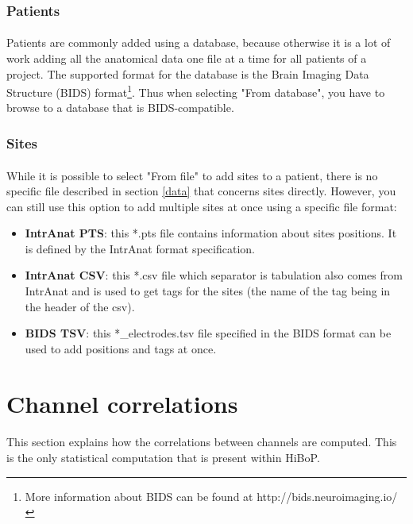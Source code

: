 \documentclass[a4paper]{article}
\begin{document}
\subsubsection{Patients}
\paragraph{} Patients are commonly added using a database, because otherwise it is a lot of work adding all the anatomical data one file at a time for all patients of a project. The supported format for the database is the Brain Imaging Data Structure (BIDS) format\footnote{More information about BIDS can be found at http://bids.neuroimaging.io/}. Thus when selecting "From database", you have to browse to a database that is BIDS-compatible.
\subsubsection{Sites}
\paragraph{} While it is possible to select "From file" to add sites to a patient, there is no specific file described in section \ref{data} that concerns sites directly. However, you can still use this option to add multiple sites at once using a specific file format:
\begin{itemize}
\item \textbf{IntrAnat PTS}: this *.pts file contains information about sites positions. It is defined by the IntrAnat format specification.
\item \textbf{IntrAnat CSV}: this *.csv file which separator is tabulation also comes from IntrAnat and is used to get tags for the sites (the name of the tag being in the header of the csv).
\item \textbf{BIDS TSV}: this *\_electrodes.tsv file specified in the BIDS format can be used to add positions and tags at once.
\end{itemize}
\section{Channel correlations}\label{correlations}
\paragraph{} This section explains how the correlations between channels are computed. This is the only statistical computation that is present within HiBoP.
\end{document}
